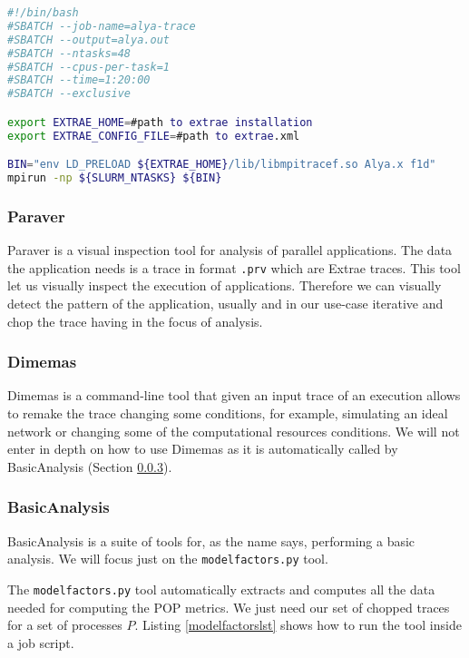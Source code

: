 \begin{lstlisting}[language=sh, caption={Running Alya with SLURM and Extrae.}, label={jobtrace}]
#!/bin/bash
#SBATCH --job-name=alya-trace
#SBATCH --output=alya.out
#SBATCH --ntasks=48
#SBATCH --cpus-per-task=1
#SBATCH --time=1:20:00
#SBATCH --exclusive

export EXTRAE_HOME=#path to extrae installation
export EXTRAE_CONFIG_FILE=#path to extrae.xml

BIN="env LD_PRELOAD ${EXTRAE_HOME}/lib/libmpitracef.so Alya.x f1d"
mpirun -np ${SLURM_NTASKS} ${BIN}
\end{lstlisting}

\subsubsection{Paraver}

Paraver\cite{paraver} is a visual inspection tool for analysis of parallel applications. The data the application needs is a trace in format \texttt{.prv} which are Extrae traces. This tool let us visually inspect the execution of applications. Therefore we can visually detect the pattern of the application, usually and in our use-case iterative and chop the trace having in the focus of analysis.


\subsubsection{Dimemas}

Dimemas\cite{dimemas} is a command-line tool that given an input trace of an execution allows to remake the trace changing some conditions, for example, simulating an ideal network or changing some of the computational resources conditions. We will not enter in depth on how to use Dimemas as it is automatically called by BasicAnalysis (Section \ref{basicanalysis}).

\subsubsection{BasicAnalysis}\label{basicanalysis}

BasicAnalysis\cite{basic_analysis} is a suite of tools for,  as the name says, performing a basic analysis. We will focus just on the \texttt{modelfactors.py} tool.

The \texttt{modelfactors.py} tool automatically extracts and computes all the data needed for computing the POP metrics. We just need our set of chopped traces for a set of processes $P$. Listing \ref{modelfactorslst} shows how to run the tool inside a job script.

